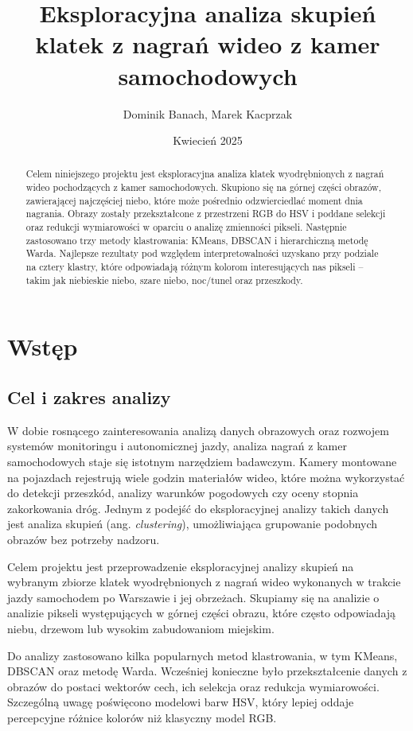 \documentclass[12pt]{article}
\title{Eksploracyjna analiza skupień klatek z nagrań wideo z kamer samochodowych}
\author{Dominik Banach, Marek Kacprzak}
\date{Kwiecień 2025}
\begin{document}
\maketitle

\begin{abstract}
    Celem niniejszego projektu jest eksploracyjna analiza klatek wyodrębnionych z nagrań wideo pochodzących z kamer samochodowych. Skupiono się na górnej części obrazów, zawierającej najczęściej niebo, które może pośrednio odzwierciedlać moment dnia nagrania. Obrazy zostały przekształcone z przestrzeni RGB do HSV i poddane selekcji oraz redukcji wymiarowości w oparciu o analizę zmienności pikseli. Następnie zastosowano trzy metody klastrowania: KMeans, DBSCAN i hierarchiczną metodę Warda. Najlepsze rezultaty pod względem interpretowalności uzyskano przy podziale na cztery klastry, które odpowiadają różnym kolorom interesujących nas pikseli – takim jak niebieskie niebo, szare niebo, noc/tunel oraz przeszkody.
\end{abstract}

\section{Wstęp}
\subsection{Cel i zakres analizy}
W dobie rosnącego zainteresowania analizą danych obrazowych oraz rozwojem systemów monitoringu i autonomicznej jazdy, analiza nagrań z kamer samochodowych staje się istotnym narzędziem badawczym. Kamery montowane na pojazdach rejestrują wiele godzin materiałów wideo, które można wykorzystać do detekcji przeszkód, analizy warunków pogodowych czy oceny stopnia zakorkowania dróg. Jednym z podejść do eksploracyjnej analizy takich danych jest analiza skupień (ang. \textit{clustering}), umożliwiająca grupowanie podobnych obrazów bez potrzeby nadzoru.

Celem projektu jest przeprowadzenie eksploracyjnej analizy skupień na wybranym zbiorze klatek wyodrębnionych z nagrań wideo wykonanych w trakcie jazdy samochodem po Warszawie i jej obrzeżach. Skupiamy się na analizie o analizie pikseli występujących w górnej części obrazu, które często odpowiadają niebu, drzewom lub wysokim zabudowaniom miejskim.

Do analizy zastosowano kilka popularnych metod klastrowania, w tym KMeans, DBSCAN oraz metodę Warda. Wcześniej konieczne było przekształcenie danych z obrazów do postaci wektorów cech, ich selekcja oraz redukcja wymiarowości. Szczególną uwagę poświęcono modelowi barw HSV, który lepiej oddaje percepcyjne różnice kolorów niż klasyczny model RGB.
\end{document}
